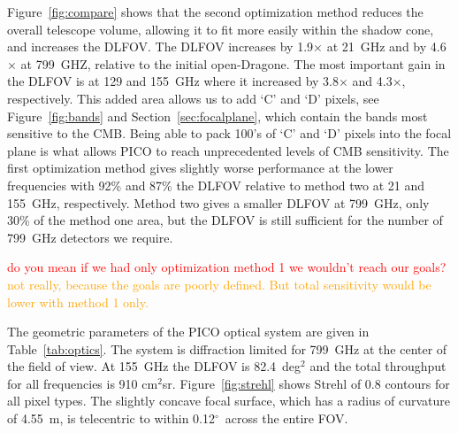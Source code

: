 \documentclass[]{spie}  %
\newcommand{\comr}[1]{\textcolor{red}{#1}}
\newcommand{\como}[1]{\textcolor{orange}{#1}}
\newcommand{\dgr}{$^\circ$}
\begin{document}
Figure~\ref{fig:compare} 
shows that the second optimization method reduces the overall telescope volume, allowing it to fit more easily within the shadow cone, 
and increases the DLFOV.  
The DLFOV increases by 1.9$\times$ at 21~GHz and by 4.6$\times$ at 799~GHZ, relative to the initial open-Dragone. 
The most important gain in the DLFOV is at 129 and 155~GHz where it increased by 3.8$\times$ and 4.3$\times$, respectively.  
This added area allows us to add `C' and `D' pixels, see Figure~\ref{fig:bands} and Section~\ref{sec:focalplane}, %
which contain the bands most sensitive to the CMB. Being able to 
pack 100's of `C' and `D' pixels into the focal plane is what allows PICO to reach unprecedented levels of CMB sensitivity. 
The first optimization method gives slightly worse performance at the lower frequencies with 92\% and 87\% the DLFOV relative to method two 
at 21 and 155~GHz, respectively.  Method two gives a smaller DLFOV at 799~GHz, only 30\% of the method one area, but the DLFOV is still sufficient 
for the number of 799~GHz detectors we require. 

 \comr{do you mean if we had only optimization method 1 we wouldn't reach our goals?} \como{not really, because the goals are poorly defined.  But total sensitivity would be lower with method 1 only.}

The geometric parameters of the PICO optical system are given in Table~\ref{tab:optics}. The 
system is diffraction limited for 799~GHz at the center of the field of view. At 155~GHz the 
DLFOV is 82.4~deg$^2$ and the total throughput for all frequencies is 910 cm$^2$sr. 
Figure~\ref{fig:strehl} shows Strehl of 0.8 contours for all pixel types.
The slightly concave focal surface, which has a radius of curvature of 4.55~m, is telecentric to 
within 0.12\dgr\ across the entire FOV.
\end{document}
